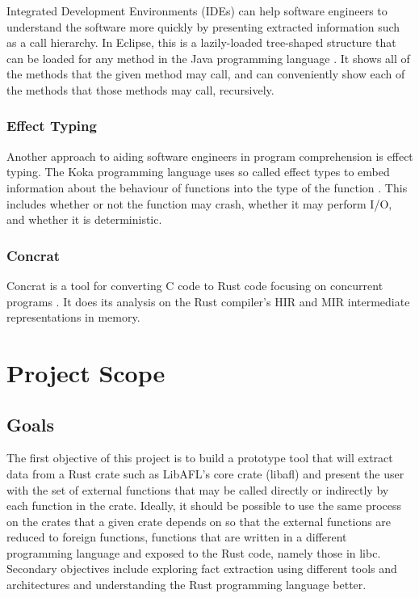 \documentclass[11pt]{article}
\begin{document}
Integrated Development Environments (IDEs) can help software engineers to understand the software more quickly by presenting extracted information such as a call hierarchy.
In Eclipse, this is a lazily-loaded tree-shaped structure that can be loaded for any method in the Java programming language \cite{Eclipse}.
It shows all of the methods that the given method may call, and can conveniently show each of the methods that those methods may call, recursively.

\subsubsection{Effect Typing}

Another approach to aiding software engineers in program comprehension is effect typing.
The Koka programming language uses so called effect types to embed information about the behaviour of functions into the type of the function \cite{Leijen_2014}.
This includes whether or not the function may crash, whether it may perform I/O, and whether it is deterministic.

\subsubsection{Concrat}
Concrat is a tool for converting C code to Rust code focusing on concurrent programs \cite{hong2023concrat}.
It does its analysis on the Rust compiler's HIR and MIR intermediate representations in memory.

\section{Project Scope}


\subsection{Goals}

The first objective of this project is to build a prototype tool that will extract data from a Rust crate such as LibAFL's core crate (libafl) and present the user with the set of external functions that may be called directly or indirectly by each function in the crate.
Ideally, it should be possible to use the same process on the crates that a given crate depends on so that the external functions are reduced to foreign functions, functions that are written in a different programming language and exposed to the Rust code, namely those in libc.
Secondary objectives include exploring fact extraction using different tools and architectures and understanding the Rust programming language better.
\end{document}
